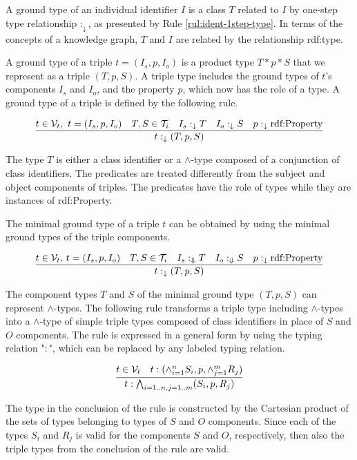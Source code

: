 \documentclass[runningheads]{llncs}
\newcommand{\darr}{\downarrow}
\newcommand{\Darr}{\Downarrow}
\newcommand{\V}{{\cal V}}
\newcommand{\T}{{\cal T}}
\begin{document}
A ground type of an individual identifier $I$ is a class $T$ related
to $I$ by one-step type relationship $:_\darr$, as presented by Rule
\ref{rul:ident-1step-type}. In terms of the concepts of a knowledge
graph, $T$ and $I$ are related by the relationship rdf:type.

A ground type of a triple $t=(I_s,p,I_o)$ is a product type
$T*p*S$ that we represent as a triple $(T,p,S)$. A triple type
includes the ground types of $t$'s components $I_s$ and $I_o$, and the
property $p$, which now has the role of a type. A ground type of a
triple is defined by the following rule.

\begin{equation}
\label{rul:3-ground}
\dfrac{t\in\V_t,\ t=(I_s,p,I_o)\quad T,S\in\T_i\quad I_s:_\darr\/T\quad I_o:_\darr\/S\quad p:_\darr\text{rdf:Property}}
      {t:_\darr(T,p,S)}
\end{equation}

The type $T$ is either a class identifier or a $\land$-type composed
of a conjunction of class identifiers. The predicates are treated
differently from the subject and object components of triples. The
predicates have the role of types while they are instances of
rdf:Property.

The minimal ground type of a triple $t$ can be obtained by using the
minimal ground types of the triple components. 

\begin{equation}
\label{rul:3-min-ground}
\dfrac{t\in\V_t,\, t=(I_s,p,I_o)\quad T,S\in\T_i\quad I_s:_\Darr\/T\quad I_o:_\Darr\/S\quad p:_\darr\text{rdf:Property}}
      {t:_\darr\/(T,p,S)}
\end{equation}

The component types $T$ and $S$ of the minimal ground type
$(T,p,S)$ can represent $\land$-types. The following rule transforms
a triple type including $\land$-types into a $\land$-type of simple
triple types composed of class identifiers in place of $S$ and $O$
components. The rule is expressed in a general form by using the
typing relation "$:$", which can be replaced by any labeled typing
relation.

\begin{equation}
\label{rul:3-land-transform}
\dfrac{t\in\V_t\quad t:(\land_{i=1}^n\/S_i,p,\land_{j=1}^mR_j)}
      {t:\bigwedge_{i=1..n, j=1..m}(S_i,p,R_j)}
\end{equation}

The type in the conclusion of the rule is constructed by the Cartesian
product of the sets of types belonging to types of $S$ and $O$
components. Since each of the types $S_i$ and $R_j$ is valid for the
components $S$ and $O$, respectively, then also the triple types from
the conclusion of the rule are valid.
\end{document}
